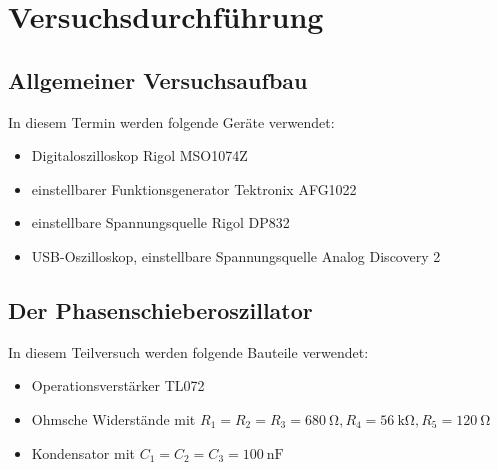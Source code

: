 
\section{Versuchsdurchführung}

\subsection{ Allgemeiner Versuchsaufbau}

In diesem Termin werden folgende Geräte verwendet:
%
\begin{itemize}
    \item  Digitaloszilloskop Rigol MSO1074Z
    \item einstellbarer Funktionsgenerator Tektronix AFG1022
    \item einstellbare Spannungsquelle Rigol DP832
    \item USB-Oszilloskop, einstellbare Spannungsquelle Analog Discovery 2
\end{itemize}

\subsection{Der Phasenschieberoszillator}
%
In diesem Teilversuch werden folgende Bauteile verwendet:

\begin{itemize}
    \item Operationsverstärker TL072
    \item Ohmsche Widerstände mit $R_1=R_2=R_3=\SI{680}{\ohm}, R_4=\SI{56}{\kilo\ohm}, R_5=\SI{120}{\ohm}$
    \item Kondensator mit $C_1=C_2=C_3=\SI{100}{\nano\farad}$
\end{itemize}

